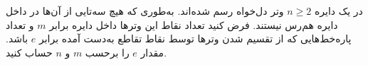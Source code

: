 \EXERCISE
در یک دایره
$n \geq 2$
وتر دل‌خواه رسم شده‌اند. به‌طوری که هیچ سه‌تایی از آن‌ها در داخل دایره هم‌رس نیستند. فرض کنید تعداد نقاط این وترها داخل دایره برابر
$m$
و تعداد پاره‌خط‌هایی که از تقسیم شدن وترها توسط نقاط تقاطع به‌دست آمده برابر
$e$
باشد. مقدار
$e$
را برحسب
$m$
و
$n$
حساب کنید.